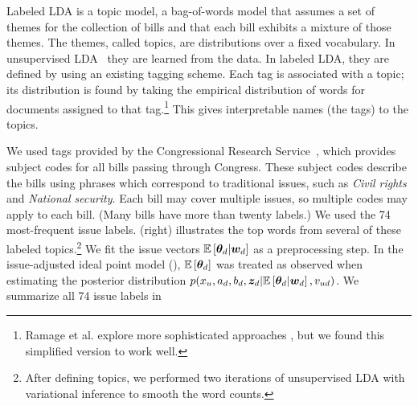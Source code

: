 Labeled LDA is a topic model, a bag-of-words model that assumes a set
of themes for the collection of bills and that each bill exhibits a
mixture of those themes.  The themes, called topics, are distributions
over a fixed vocabulary.  In unsupervised LDA~\cite{blei:2003} they
are learned from the data.  In labeled LDA, they are defined by using
an existing tagging scheme.  Each tag is associated with a topic; its
distribution is found by taking the empirical distribution of words
for documents assigned to that tag.\footnote{Ramage et al.  explore
  more sophisticated approaches \cite{ramage:2009}, but we found this
  simplified version to work well.}  This gives
interpretable names (the tags) to the topics.

We used tags provided by the Congressional Research
Service~\cite{crs:2011}, which provides subject codes for all bills
passing through Congress.  These subject codes describe the bills
using phrases which correspond to traditional issues, such as
\emph{Civil rights} and \emph{National security}. Each bill may cover
multiple issues, so multiple codes may apply to each bill. (Many bills
have more than twenty labels.)  We used the 74 most-frequent issue
labels.  (right) illustrates the top
words from several of these labeled topics.\footnote{After defining
  topics, we performed two iterations of unsupervised LDA with
  variational inference to smooth the word counts.} We fit the issue
vectors $\mathbb{E}\left[\bm \theta_d | \bm w_d\right]$ as a preprocessing step.  In
the issue-adjusted ideal point model
(), $\mathbb{E}\left[\bm \theta_d\right]$
was treated as observed when estimating the posterior distribution
$p(x_u, a_d, b_d, \bm z_d | \mathbb{E}\left[\bm \theta_d | \bm w_d\right],
v_{ud})$. We summarize all 74 issue labels in 



